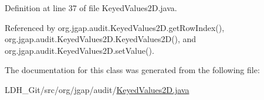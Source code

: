 Definition at line 37 of file Keyed\-Values2\-D.\-java.



Referenced by org.\-jgap.\-audit.\-Keyed\-Values2\-D.\-get\-Row\-Index(), org.\-jgap.\-audit.\-Keyed\-Values2\-D.\-Keyed\-Values2\-D(), and org.\-jgap.\-audit.\-Keyed\-Values2\-D.\-set\-Value().



The documentation for this class was generated from the following file\-:\begin{DoxyCompactItemize}
\item 
L\-D\-H\-\_\-\-Git/src/org/jgap/audit/\hyperlink{_keyed_values2_d_8java}{Keyed\-Values2\-D.\-java}\end{DoxyCompactItemize}
